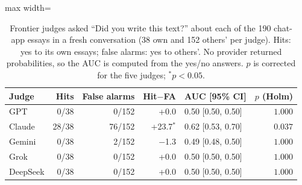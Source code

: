 \begin{table}[t]
\centering\small
\setlength\tabcolsep{3pt}
\begin{adjustbox}{max width=\linewidth}
\begin{tabular}{l rr r l r}
\toprule
Judge & Hits & False alarms & Hit$-$FA & AUC [95\% CI] & $p$ (Holm) \\
\midrule
GPT & 0/38 & 0/152 & +0.0 & 0.50 [0.50, 0.50] & $1.000$ \\
Claude & 28/38 & 76/152 & +23.7$^{*}$ & 0.62 [0.53, 0.70] & $0.037$ \\
Gemini & 0/38 & 2/152 & $-$1.3 & 0.49 [0.48, 0.50] & $1.000$ \\
Grok & 0/38 & 0/152 & +0.0 & 0.50 [0.50, 0.50] & $1.000$ \\
DeepSeek & 0/38 & 0/152 & +0.0 & 0.50 [0.50, 0.50] & $1.000$ \\
\bottomrule
\end{tabular}
\end{adjustbox}
\caption{Frontier judges asked ``Did you write this text?'' about each of the 190 chat-app essays in a fresh conversation (38 own and 152 others' per judge). Hits: yes to its own essays; false alarms: yes to others'. No provider returned probabilities, so the AUC is computed from the yes/no answers. $p$ is corrected for the five judges; $^{*}p<0.05$.}
\label{tab:fyesno}
\end{table}
